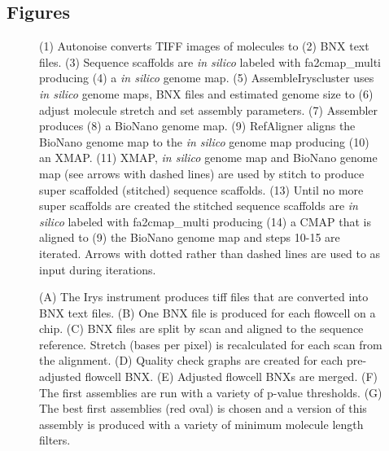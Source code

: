 \documentclass{bmcart}
\begin{document}
\begin{backmatter}



\section*{Figures}
  \begin{figure}[h!]
  	\caption{
  		(1) Autonoise converts TIFF images of molecules to (2) BNX text files. (3) Sequence scaffolds are \textit{in silico} labeled with fa2cmap\_multi producing (4) a \textit{in silico} genome map. (5) AssembleIryscluster uses \textit{in silico} genome maps, BNX files and estimated genome size to (6) adjust molecule stretch and set assembly parameters. (7) Assembler produces (8) a BioNano genome map. (9) RefAligner aligns the BioNano genome map to the \textit{in silico} genome map producing (10) an XMAP. (11) XMAP, \textit{in silico} genome map and BioNano genome map (see arrows with dashed lines) are used by stitch to produce super scaffolded (stitched) sequence scaffolds. (13) Until no more super scaffolds are created the stitched sequence scaffolds are \textit{in silico} labeled with fa2cmap\_multi producing (14) a CMAP that is aligned to (9) the BioNano genome map and steps 10-15 are iterated. Arrows with dotted rather than dashed lines are used to as input during iterations.}
  \end{figure}
  \begin{figure}[h!]
  	\caption{
  		(A) The Irys instrument produces tiff files that are converted into BNX text files. (B) One BNX file is produced for each flowcell on a chip. (C) BNX files are split by scan and aligned to the sequence reference. Stretch (bases per pixel) is recalculated for each scan from the alignment. (D) Quality check graphs are created for each pre-adjusted flowcell BNX. (E) Adjusted flowcell BNXs are merged. (F) The first assemblies are run with a variety of p-value thresholds. (G) The best first assemblies (red oval) is chosen and a version of this assembly is produced with a variety of minimum molecule length filters.}

\end{figure}
\end{backmatter}
\end{document}
